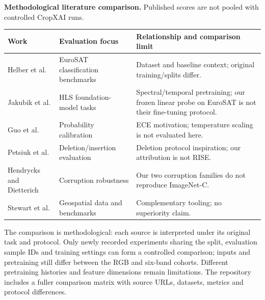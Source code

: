 \documentclass[3p,times,procedia]{elsarticle}
\begin{document}
\begin{center}\small
\textbf{Methodological literature comparison.} Published scores are not pooled with controlled CropXAI runs.\par\medskip
\begin{tabular}{p{.23\linewidth}p{.29\linewidth}p{.39\linewidth}}\toprule
Work & Evaluation focus & Relationship and comparison limit\\\midrule
Helber et al. \cite{eurosat} & EuroSAT classification benchmarks & Dataset and baseline context; original training/splits differ.\\
Jakubik et al. \cite{prithvi} & HLS foundation-model tasks & Spectral/temporal pretraining; our frozen linear probe on EuroSAT is not their fine-tuning protocol.\\
Guo et al. \cite{calibration} & Probability calibration & ECE motivation; temperature scaling is not evaluated here.\\
Petsiuk et al. \cite{rise} & Deletion/insertion evaluation & Deletion protocol inspiration; our attribution is not RISE.\\
Hendrycks and Dietterich \cite{corruptions} & Corruption robustness & Our two corruption families do not reproduce ImageNet-C.\\
Stewart et al. \cite{torchgeo} & Geospatial data and benchmarks & Complementary tooling; no superiority claim.\\\bottomrule
\end{tabular}\end{center}

The comparison is methodological: each source is interpreted under its original task and protocol. Only newly recorded experiments sharing the split, evaluation sample IDs and training settings can form a controlled comparison; inputs and pretraining still differ between the RGB and six-band cohorts. Different pretraining histories and feature dimensions remain limitations. The repository includes a fuller comparison matrix with source URLs, datasets, metrics and protocol differences.
\end{document}
